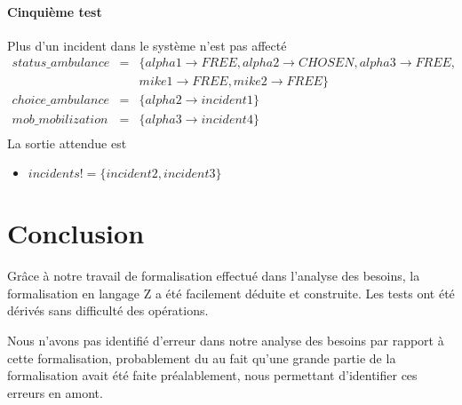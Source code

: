 \documentclass{report}
\begin{document}
\subsubsection{Cinquième test}
Plus d'un incident dans le système n'est pas affecté
\begin{eqnarray*}
status\_ambulance &=& \{alpha1 \rightarrow FREE, alpha2 \rightarrow CHOSEN, alpha3 \rightarrow FREE, \\ 
	&& mike1 \rightarrow FREE, mike2 \rightarrow FREE\} \\
choice\_ambulance &=& \{alpha2 \rightarrow incident1\} \\
mob\_mobilization &=& \{alpha3 \rightarrow incident4\} \\
\end{eqnarray*}
La sortie attendue est 
\begin{itemize}
	\item $incidents! = \{incident2, incident3\}$
\end{itemize}

\chapter*{Conclusion}

Grâce à notre travail de formalisation effectué dans l'analyse des besoins, 
la formalisation en langage Z a été facilement déduite et construite. Les tests
ont été dérivés sans difficulté des opérations. 

Nous n'avons pas identifié d'erreur dans notre analyse des besoins par
rapport à cette formalisation, probablement du au fait qu'une grande partie
de la formalisation avait été faite préalablement, nous permettant d'identifier
ces erreurs en amont.
\end{document}

